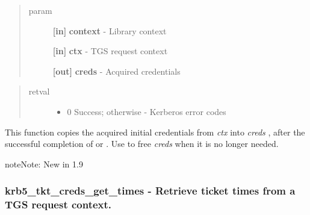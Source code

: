 \documentclass[letterpaper,10pt,english]{sphinxmanual}
\begin{document}
\begin{quote}\begin{description}
\item[{param}] \leavevmode
\textbf{{[}in{]}} \textbf{context} - Library context

\textbf{{[}in{]}} \textbf{ctx} - TGS request context

\textbf{{[}out{]}} \textbf{creds} - Acquired credentials

\end{description}\end{quote}
\begin{quote}\begin{description}
\item[{retval}] \leavevmode\begin{itemize}
\item {} 
0   Success; otherwise - Kerberos error codes

\end{itemize}

\end{description}\end{quote}

This function copies the acquired initial credentials from \emph{ctx} into \emph{creds} , after the successful completion of {\hyperref[appdev/refs/api/krb5_tkt_creds_get:c.krb5_tkt_creds_get]{}} or {\hyperref[appdev/refs/api/krb5_tkt_creds_step:c.krb5_tkt_creds_step]{}} . Use {\hyperref[appdev/refs/api/krb5_free_cred_contents:c.krb5_free_cred_contents]{}} to free \emph{creds} when it is no longer needed.

\begin{notice}{note}{Note:}
New in 1.9
\end{notice}


\subsubsection{krb5\_tkt\_creds\_get\_times -  Retrieve ticket times from a TGS request context.}
\label{appdev/refs/api/krb5_tkt_creds_get_times:krb5-tkt-creds-get-times-retrieve-ticket-times-from-a-tgs-request-context}\label{appdev/refs/api/krb5_tkt_creds_get_times::doc}

\begin{fulllineitems}
\label{appdev/refs/api/krb5_tkt_creds_get_times:c.krb5_tkt_creds_get_times}
\end{fulllineitems}
\end{document}
